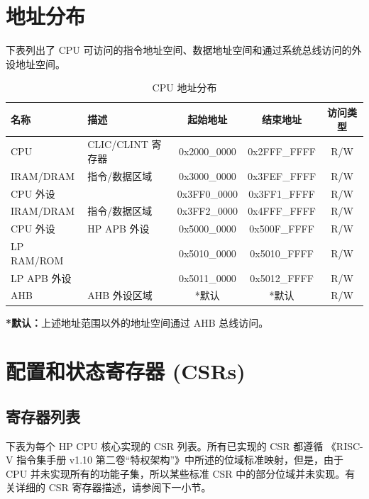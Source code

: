 \documentclass[main\_\_CN.tex]{subfiles}
\begin{document}
\section{地址分布}

下表列出了 CPU 可访问的指令地址空间、数据地址空间和通过系统总线访问的外设地址空间。

\begin{longtable}{| l| l |c | c | c  |}
\caption{CPU 地址分布} \label{tab:riscvcpu-mem-blocks}
\\ \hline
\rowcolor{lightgray}
\textbf{名称} & \textbf{描述}    & \textbf{起始地址}  & \textbf{结束地址}  & \textbf{访问类型}   \\ \hline
CPU \label{cpu} &  CLIC/CLINT 寄存器 &      0x2000\_0000  &  0x2FFF\_FFFF  &  R/W  \\ \hline
IRAM/DRAM\label{ram} & 指令/数据区域 &   0x3000\_0000  &  0x3FEF\_FFFF  &  R/W  \\ \hline
CPU 外设 \label{cpu_peri} &   &      0x3FF0\_0000  &  0x3FF1\_FFFF  &  R/W  \\ \hline
IRAM/DRAM\label{ram2} & 指令/数据区域 &   0x3FF2\_0000  &  0x4FFF\_FFFF  &  R/W  \\ \hline
CPU 外设 \label{cpu_peri2} & HP APB 外设  &   0x5000\_0000  &  0x500F\_FFFF  &  R/W  \\ \hline
LP RAM/ROM \label{lpram} &  &   0x5010\_0000  &  0x5010\_FFFF  &  R/W  \\ \hline
LP APB 外设 \label{lpapb} &   &   0x5011\_0000  &  0x5012\_FFFF  &  R/W  \\ \hline
AHB\label{sysahb} & AHB 外设区域 &      *默认  &  *默认  &  R/W  \\ \hline
\end{longtable}

\textbf{*默认：}上述地址范围以外的地址空间通过 AHB 总线访问。


\section{配置和状态寄存器 (CSRs)}
\hypertarget{riscvcpu-cpu-reg-summ}{}
\subsection{寄存器列表}
\label{sec:riscvcpu-cpu-reg-summ}

下表为每个 HP CPU 核心实现的 CSR 列表。所有已实现的 CSR 都遵循 《RISC-V 指令集手册 v1.10 第二卷“特权架构”》中所述的位域标准映射，但是，由于 CPU 并未实现所有的功能子集，所以某些标准 CSR 中的部分位域并未实现。有关详细的 CSR 寄存器描述，请参阅下一小节。
\end{document}
